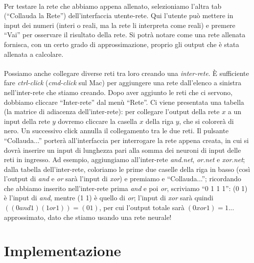 \documentclass{article}
\begin{document}
\paragraph{} Per testare la rete che abbiamo appena allenato, selezioniamo l'altra tab (“Collauda la Rete”) dell'interfaccia utente-rete. Qui l'utente può mettere in input dei numeri (interi o reali, ma la rete li interpreta come reali) e premere “Vai” per osservare il risultato della rete. Si potrà notare come una rete allenata fornisca, con un certo grado di approssimazione, proprio gli output che è stata allenata a calcolare.

\paragraph{} Possiamo anche collegare diverse reti tra loro creando una \emph{inter-rete}. È sufficiente fare \emph{ctrl-click} (\emph{cmd-click} sul Mac) per aggiungere una rete dall'elenco a sinistra nell'inter-rete che stiamo creando. Dopo aver aggiunto le reti che ci servono, dobbiamo cliccare “Inter-rete” dal menù “Rete”. Ci viene presentata una tabella (la matrice di adiacenza dell'inter-rete): per collegare l'output della rete $x$ a un input della rete $y$ dovremo cliccare la casella $x$ della riga $y$, che si colorerà di nero. Un successivo click annulla il collegamento tra le due reti. Il pulsante “Collauda...” porterà all'interfaccia per interrogare la rete appena creata, in cui si dovrà inserire un input di lunghezza pari alla somma dei neuroni di input delle reti in ingresso. Ad esempio, aggiungiamo all'inter-rete \emph{and.net}, \emph{or.net} e \emph{xor.net}; dalla tabella dell'inter-rete, coloriamo le prime due caselle della riga in basso (così l'output di \emph{and} e \emph{or} sarà l'input di \emph{xor}) e premiamo e “Collauda...”; ricordando che abbiamo inserito nell'inter-rete prima \emph{and} e poi \emph{or}, scriviamo “0 1   1 1”: (0 1) è l'input di \emph{and}, mentre (1 1) è quello di \emph{or}; l'input di \emph{xor} sarà quindi $((0 and 1) (1 or 1)) = (0 1)$, per cui l'output totale sarà $(0 xor 1) = 1$... approssimato, dato che stiamo usando una rete neurale!




\section{Implementazione}
\end{document}
